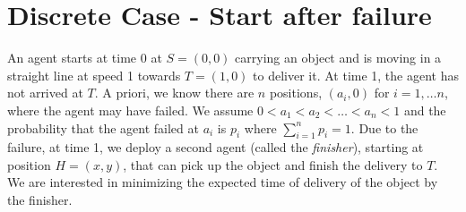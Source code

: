 \documentclass{article}
\newcommand\JC[1]{{\color{Maroon} JC: #1}}         %
\newtheorem{theorem}{Theorem}[section]
\begin{document}
%

\section{Discrete Case - Start after failure}


An agent starts at time 0 at $S = (0, 0)$ carrying an object and is moving in a straight line at speed 1 towards $T = (1,0)$ to deliver it. At time
1, the agent has not arrived at $T$. A priori, we know there are $n$ positions, $(a_i, 0)$ for  $i = 1, \ldots n$,  where the agent may have failed. 
We assume $0< a_1 < a_2 < \ldots < a_n < 1$ and the probability that the agent failed at $a_i$ is $p_i$ where $\sum_{i=1}^n p_i = 1$.
Due to the failure, at time 1, we deploy a second agent (called the \textit{finisher}), starting at position $H = (x,y)$, that can pick up the object and finish the delivery to $T$.
We are interested in minimizing the expected time of delivery of the object by the finisher. 
\end{document}
